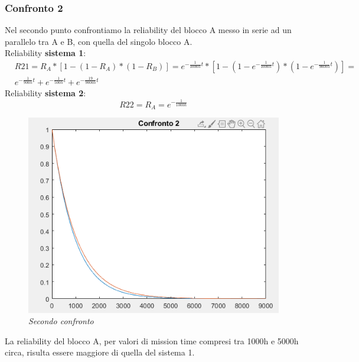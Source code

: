 \subsubsection{Confronto 2}
Nel secondo punto confrontiamo la reliability del blocco A messo in serie ad un parallelo tra A e B, con quella del singolo blocco A. 
\\
Reliability \textbf{sistema 1}:
\begin{equation*}
	\begin{split}
		&R21= R_A*[1-(1-R_A)*(1-R_B)] =e^{-\frac{1}{1000h} t}*[1-(1-e^{-\frac{1}{1000h} t})*(1-e^{-\frac{1}{9000h} t})] = \\
		&e^{-\frac{1}{900h}t}+e^{-\frac{1}{500h}t}+e^{-\frac{19}{9000h}t}
	\end{split}
\end{equation*}
Reliability \textbf{sistema 2}:
\begin{equation*}
	R22 = R_A = e^{-\frac{1}{1000h}}
\end{equation*}
\begin{figure}[H]
	\centering
	\includegraphics[width=\textwidth]{img/hw5/es4_2.png}
	\caption{\textit{Secondo confronto}}
\end{figure}
La reliability del blocco A, per valori di mission time compresi tra 1000h e 5000h circa, risulta essere maggiore di quella del sistema 1.

